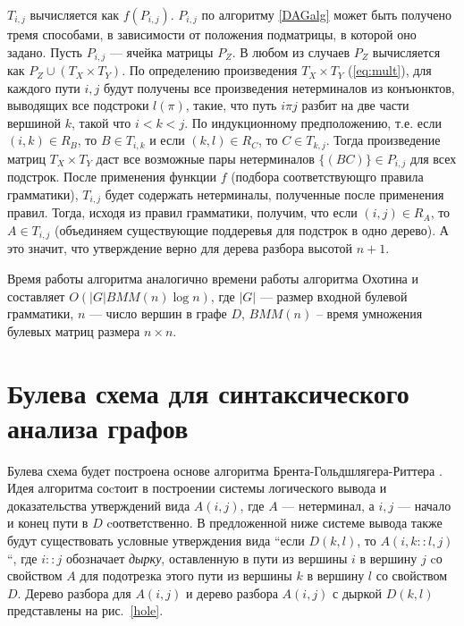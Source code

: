 \documentclass{spbau-diploma}
\begin{document}
$T_{i,j}$
вычисляется как $f(P_{i,j})$. $P_{i,j}$ по алгоритму \ref{DAGalg} может быть получено
тремя способами, в зависимости от положения подматрицы, в
которой оно задано. Пусть $P_{i,j}$ --- ячейка матрицы $P_Z$. В любом из
случаев  $P_Z$ вычисляется как $P_Z \cup (T_X \times T_Y)$. По определению
произведения $T_X \times T_Y$ (\ref{eq:mult}), для каждого пути $i, j$ будут получены все
произведения нетерминалов из конъюнктов, выводящих все
подстроки $l(\pi)$, такие, что путь $i \pi j$ разбит на две части вершиной
$k$, такой что $i < k < j$. По индукционному предположению,  т.е. если $(i,k) \in R_B$, то  $B \in T_{i,k}$ и если $(k,l) \in R_C$, то $C \in T_{k, j}$. Тогда 
произведение матриц $T_X \times T_Y$ даст все возможные пары нетерминалов $\{(BC)\} \in P_{i,j}$ для всех подстрок. После применения функции $f$ (подбора соответствующго правила грамматики),  $T_{i,j}$ будет содержать нетерминалы, полученные после применения правил. Тогда, исходя из правил грамматики, получим, что если $(i,j) \in R_A$, то $A \in T_{i, j}$ (объединяем существующие поддеревья для подстрок в одно дерево).  А это значит, что утверждение верно для дерева разбора высотой $n + 1$. 

Время работы алгоритма аналогично времени работы алгоритма
Охотина \cite{OkhotinParse} и составляет $O(|G|BMM(n) \log n)$, где $|G|$ --- размер
входной булевой грамматики, $n$ --- число вершин в графе $D$,
$BMM(n)$ – время умножения булевых матриц размера $n \times n$.



\section {Булева схема для синтаксического анализа графов} 

Булева схема будет построена основе алгоритма Брента-Гольдшлягера-Риттера \cite{Brent}. Идея алгоритма соcтоит в построении системы логического вывода и доказательства утверждений вида $A(i, j)$, где $A$ --- нетерминал, а $i, j$ --- начало и конец пути в $D$ cоответственно. В предложенной ниже системе вывода также будут существовать условные утверждения вида ``если $D(k, l)$, то $A(i, k::l, j)$``, где $i::j$ обозначает \textit{дырку}, оставленную в пути из вершины $i$ в вершину $j$ cо свойством $A$ для подотрезка этого пути из вершины $k$ в вершину $l$ со свойством $D$. Дерево разбора для $A(i, j)$ и дерево разбора $A(i, j)$ с дыркой $D(k, l)$ представлены на рис.~\ref{hole}.
\end{document}
